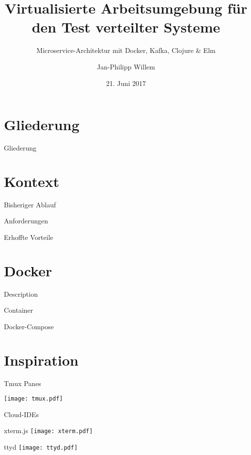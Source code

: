 \documentclass[compress]{beamer}
\title{Virtualisierte Arbeitsumgebung für den Test verteilter Systeme}
\subtitle{Microservice-Architektur mit Docker, Kafka, Clojure \& Elm}
\author{Jan-Philipp Willem}
\institute{Fakultät für Informatik\\Hochschule Mannheim}
\date{21. Juni 2017}
\begin{document}

\maketitle


\section*{Gliederung}
\begin{frame}{Gliederung}
  \tableofcontents[hideallsubsections]
\end{frame}

\section{Kontext}
\begin{frame}{Bisheriger Ablauf}
\end{frame}
\begin{frame}{Anforderungen}
\end{frame}
\begin{frame}{Erhoffte Vorteile}
\end{frame}

\section{Docker}
\begin{frame}{Description}
\end{frame}
\begin{frame}{Container}
\end{frame}
\begin{frame}{Docker-Compose}
\end{frame}

\section{Inspiration}
\begin{frame}{Tmux Panes}
  
    \texttt{[image: tmux.pdf]}
\end{frame}
\begin{frame}{Cloud-IDEs}
\end{frame}
\begin{frame}{xterm.js}
  \texttt{[image: xterm.pdf]}
\end{frame}
\begin{frame}{ttyd}
  \texttt{[image: ttyd.pdf]}
\end{frame}
\end{document}

